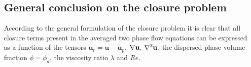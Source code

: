 





\subsection{General conclusion on the closure problem}

According to the general formulation of the closure problem it is clear that all closure terms present in the averaged two phase flow equations can be expressed as a function of the tensors $\textbf{u}_{r} =\textbf{u}- \textbf{u}_p$, $\mathbf{\nabla} \textbf{u}$, $\mathbf{\nabla}^2 \textbf{u}$, the dispersed phase volume fraction $\phi =\phi_d$, the viscosity ratio $\lambda$ and  $Re$. 


